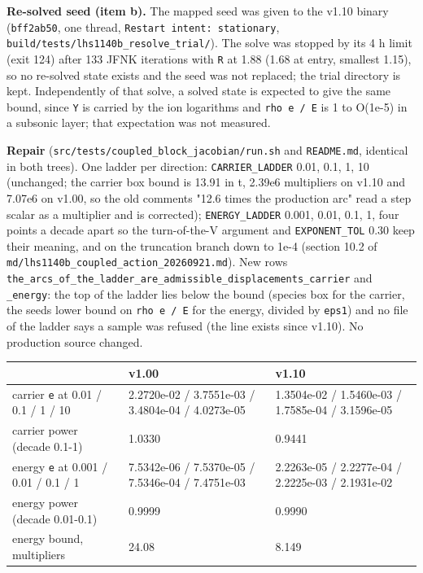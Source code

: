 \documentclass[english,a4paper]{my_memo}
\begin{document}
\textbf{Re-solved seed (item b).} The mapped seed was given to the v1.10 binary (\texttt{bff2ab50}, one thread, \texttt{Restart\ intent:\ stationary}, \texttt{build/tests/lhs1140b\_resolve\_trial/}). The solve was stopped by its 4 h limit (exit 124) after 133 JFNK iterations with \texttt{\textbar{}\textbar{}R\textbar{}\textbar{}} at 1.88 (1.68 at entry, smallest 1.15), so no re-solved state exists and the seed was not replaced; the trial directory is kept. Independently of that solve, a solved state is expected to give the same bound, since \texttt{\textbar{}\textbar{}Y\textbar{}\textbar{}} is carried by the ion logarithms and \texttt{rho\ e\ /\ E} is 1 to O(1e-5) in a subsonic layer; that expectation was not measured.

\textbf{Repair} (\texttt{src/tests/coupled\_block\_jacobian/run.sh} and \texttt{README.md}, identical in both trees). One ladder per direction: \texttt{CARRIER\_LADDER} 0.01, 0.1, 1, 10 (unchanged; the carrier box bound is 13.91 in t, 2.39e6 multipliers on v1.10 and 7.07e6 on v1.00, so the old comment\textquotesingle s "12.6 times the production arc" read a step scalar as a multiplier and is corrected); \texttt{ENERGY\_LADDER} 0.001, 0.01, 0.1, 1, four points a decade apart so the turn-of-the-V argument and \texttt{EXPONENT\_TOL} 0.30 keep their meaning, and on the truncation branch down to 1e-4 (section 10.2 of \texttt{md/lhs1140b\_coupled\_action\_20260921.md}). New rows \texttt{the\_arcs\_of\_the\_ladder\_are\_admissible\_displacements\_carrier} and \texttt{\_energy}: the top of the ladder lies below the bound (species box for the carrier, the seed\textquotesingle s lower bound on \texttt{rho\ e\ /\ E} for the energy, divided by \texttt{eps1}) and no file of the ladder says a sample was refused (the line exists since v1.10). No production source changed.

{\def\LTcaptype{none} %
{\small
\begin{longtable}[]{@{}lll@{}}
\toprule\noalign{}
& v1.00 & v1.10 \\
\midrule\noalign{}
\endhead
\bottomrule\noalign{}
\endlastfoot
carrier \texttt{e} at 0.01 / 0.1 / 1 / 10 & 2.2720e-02 / 3.7551e-03 / 3.4804e-04 / 4.0273e-05 & 1.3504e-02 / 1.5460e-03 / 1.7585e-04 / 3.1596e-05 \\
carrier power (decade 0.1-1) & 1.0330 & 0.9441 \\
energy \texttt{e} at 0.001 / 0.01 / 0.1 / 1 & 7.5342e-06 / 7.5370e-05 / 7.5346e-04 / 7.4751e-03 & 2.2263e-05 / 2.2277e-04 / 2.2225e-03 / 2.1931e-02 \\
energy power (decade 0.01-0.1) & 0.9999 & 0.9990 \\
energy bound, multipliers & 24.08 & 8.149 \\
\end{longtable}
}
}
\end{document}
